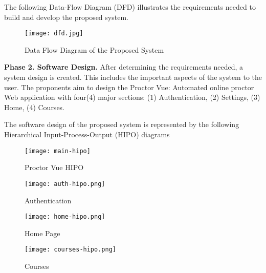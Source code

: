 The following Data-Flow Diagram (DFD) illustrates the requirements needed to build and develop the proposed system.

\pagebreak

\begin{figure}[h!]
   \begin{center}
      \texttt{[image: dfd.jpg]}
      \caption{Data Flow Diagram of the Proposed System}
   \end{center}
\end{figure}

\textbf{Phase 2. Software Design.}
After determining the requirements needed, a system design is created.
This includes the important aspects of the system to the user.
The proponents aim to design the Proctor Vue: Automated online proctor Web application with four(4) major sections: (1) Authentication, (2) Settings, (3) Home, (4) Courses.

The software design of the proposed system is represented by the following Hierarchical Input-Process-Output (HIPO) diagrams

\pagebreak

\begin{figure}[h!]
   \begin{center}
      \texttt{[image: main-hipo]}
      \caption{Proctor Vue HIPO}
   \end{center}
\end{figure}

\vspace{1cm}

\begin{figure}[h!]
   \begin{center}
      \texttt{[image: auth-hipo.png]}
      \caption{Authentication}
   \end{center}
\end{figure}

\vspace{1cm}

\begin{figure}[h!]
   \begin{center}
      \texttt{[image: home-hipo.png]}
      \caption{Home Page}
   \end{center}
\end{figure}

\vspace{1cm}

\begin{figure}[h!]
   \begin{center}
      \texttt{[image: courses-hipo.png]}
      \caption{Courses}
   \end{center}
\end{figure}

